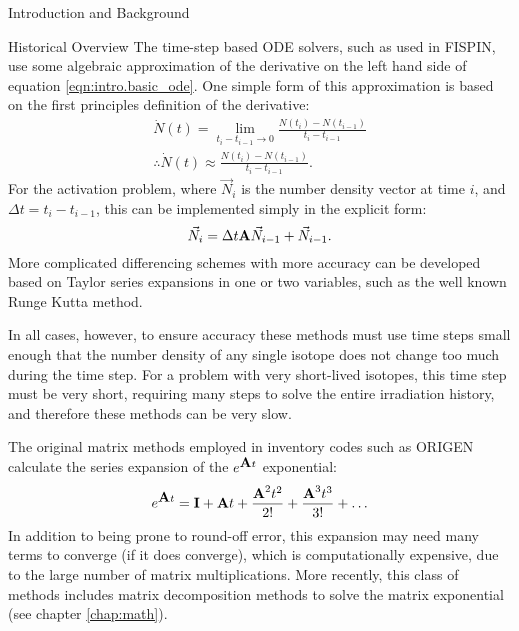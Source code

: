 \begin{chapter}{Introduction and Background}
\begin{section}{Historical Overview}
    The time-step based ODE solvers, such as used in
    FISPIN\cite{FISPIN}, use some algebraic approximation of the
    derivative on the left hand side of equation
    \ref{eqn:intro.basic_ode}.  One simple form of this approximation
    is based on the first principles definition of the derivative:
    \begin{equation*}
      \begin{split}
        \dot{N}(t) = \lim_{t_i - t_{i-1} \rightarrow 0} \frac{N(t_i)
          - N(t_{i-1})}{t_i - t_{i-1}}\\
        \therefore \dot{N}(t) \approx \frac{N(t_i)
          - N(t_{i-1})}{t_i - t_{i-1}}.
      \end{split}
    \end{equation*}
    For the activation problem, where $\vec{N}_i$ is the number
    density vector at time $i$, and $\Delta t = t_i - t_{i-1}$, this
    can be implemented simply in the explicit form:
    \begin{equation}
      \label{eqn:intro.time-step}
      \vec{N}_i = \Delta t \mbox{$\mathbf{A}$}\vec{N}_{i-1} + \vec{N}_{i-1}.
    \end{equation}
    More complicated differencing schemes with more accuracy can be
    developed based on Taylor series expansions in one or two
    variables, such as the well known Runge Kutta method.
  
    In all cases, however, to ensure accuracy these methods must use
    time steps small enough that the number density of any single
    isotope does not change too much during the time step.  For a
    problem with very short-lived isotopes, this time step must be
    very short, requiring many steps to solve the entire irradiation
    history, and therefore these methods can be very slow.
  
    The original matrix methods employed in inventory codes such as
    ORIGEN\cite{ORIGEN} calculate the series expansion of the
    $e^{\mbox{$\mathbf{A}$}t}$ exponential:
    \begin{equation*}
      e^{\mbox{$\mathbf{A}$}t} = \mbox{$\mathbf{I}$} + \mbox{$\mathbf{A}$}t + \frac{\mbox{$\mathbf{A}$}^2t^2}{2!} +
      \frac{\mbox{$\mathbf{A}$}^3t^3}{3!} + \ldots
    \end{equation*}
    In addition to being prone to round-off error, this expansion may
    need many terms to converge (if it does converge), which is
    computationally expensive, due to the large number of matrix
    multiplications.  More recently, this class of methods includes
    matrix decomposition methods to solve the matrix exponential (see
    chapter \ref{chap:math}).
  

\end{section}
\end{chapter}
